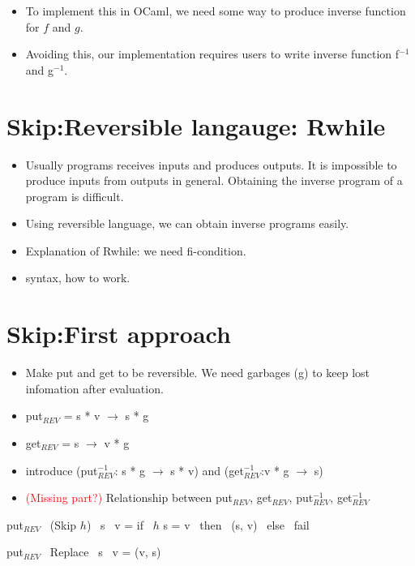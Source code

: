\documentclass[runningheads]{llncs}
\newcommand{\revput}[3]{put$_{REV}$ \ {#1} \ {#2} \ {#3}}
\newcommand{\sif}[3]{if \ {#1} \ then \ {#2} \ else \ {#3}}
\begin{document}
\begin{itemize}
\item To implement this in OCaml, we need some way to produce inverse function for $f$ and $g$.
\item Avoiding this, our implementation requires users to write inverse function f$^{-1}$ and g$^{-1}$.
\end{itemize}

\section{Skip:Reversible langauge: Rwhile}


\begin{itemize}
\item Usually programs receives inputs and produces outputs. It is impossible to produce inputs from outputs in general. Obtaining the inverse program of a program is difficult.
\item Using reversible language, we can obtain inverse programs easily.
\item Explanation of Rwhile: we need fi-condition.
\item syntax, how to work.
\end{itemize}

\section{Skip:First approach}


\begin{itemize}
\item Make put and get to be reversible. We need garbages (g) to keep lost infomation after evaluation.
\item put$_{REV}$ = s * v $\to$ s * g
\item get$_{REV}$ = s $\to$ v * g
\item introduce (put$_{REV}^{-1}$: s * g $\to$ s * v) and (get$_{REV}^{-1}$:v * g $\to$ s)
\item \textcolor{red}{(Missing part?)} Relationship between put$_{REV}$, get$_{REV}$, put$_{REV}^{-1}$, get$_{REV}^{-1}$ 
\end{itemize}




\noindent
\revput{(Skip $h$)}{s}{v} = \sif{$h$ s = v}{(s, v)}{fail}

\noindent
\revput{Replace}{s}{v} = (v, s)
\end{document}
